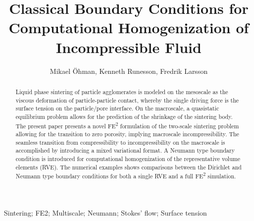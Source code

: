 \documentclass[12pt,a4paper,fleqn]{article}
\title{Classical Boundary Conditions for Computational Homogenization of Incompressible Fluid}
\author{Mikael \"Ohman, Kenneth Runesson, Fredrik Larsson}
\begin{document}

\maketitle

\begin{abstract}
\noindent
Liquid phase sintering of particle agglomerates is modeled on the mesoscale as the viscous deformation of particle-particle contact, whereby the single driving force is the surface tension on the particle/pore interface.
On the macroscale, a quasistatic equilibrium problem allows for the prediction of the shrinkage of the sintering body.
The present paper presents a novel FE\textsuperscript{2} formulation of the two-scale sintering problem allowing for the transition to zero porosity, implying macroscale incompressibility.
The seamless transition from compressibility to incompressibility on the macroscale is accomplished by introducing a mixed variational format.
A Neumann type boundary condition is introduced for computational homogenization of the representative volume elements (RVE).
The numerical examples shows comparisons between the Dirichlet and Neumann type boundary conditions for both a single RVE and a full FE\textsuperscript{2} simulation.
\end{abstract}
Sintering; FE2; Multiscale; Neumann; Stokes' flow; Surface tension

\end{document}
